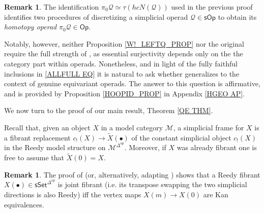 \documentclass[a4paper,10pt
,draft
]{article}%
\numberwithin{equation}{section}
\numberwithin{figure}{section}
\theoremstyle{definition} %
\newtheorem{remark}[equation]{Remark}%
\newcommand{\vect}[1]{\text{\overrightharp{\ensuremath{#1}}}}
\newcommand{\1}{\ensuremath{\mathbbm 1}}%
\begin{document}
\begin{remark}\label{TWOHOMOP REM}
	The identification
	$\pi_0 \mathcal{Q} \simeq 
	\tau \left(h c N (\mathcal{Q}) \right)$ 
	\cite[Prop. 4.8]{CM13b}
	used in the previous proof
	identifies two procedures of discretizing 
	a simplicial operad $\mathcal{Q} \in \mathsf{sOp}$
	to obtain its \emph{homotopy operad}
	$\pi_0 \mathcal{Q} \in \mathsf{Op}$.

	Notably, however, neither 
	Proposition \ref{W!_LEFTQ_PROP}
	nor the original 
	\cite[Prop. 4.9]{CM13b}
	require the full strength
	of \cite[Prop. 4.8]{CM13b}, 
	as essential surjectivity depends only on the 
	the category part within operads.
	Nonetheless, and in light of the fully faithful inclusions in 
	\eqref{ALLFULL EQ}
	it is natural to ask
	whether \cite[Prop. 4.8]{CM13b}
	generalizes to the context of genuine equivariant operads.
	The answer to this question is affirmative,
	and is provided by Proposition \ref{HOOPID_PROP}
	in Appendix \ref{HGEO AP}.
%	
%	
\end{remark}



We now turn to the proof of our main result,
Theorem \ref{QE THM}.


Recall that, given an object $X$ in a model category $\mathcal{M}$,
a simplicial frame for $X$ is a fibrant replacement
$c_!(X) \to \widetilde{X}(\bullet)$ of the constant 
simplicial object $c_!(X)$ in the Reedy model structure on $\mathcal{M}^{\Delta^{op}}$.
Moreover, if $X$ was already fibrant one is free to assume that $\widetilde{X}(0) = X$.

\begin{remark}\label{JOINTFIB REM}
	The proof of \cite[Prop. 4.5(ii)]{BP_edss}
	(or, alternatively, adapting \cite[Prop. 4.24(ii)]{BP_edss})
	shows that a Reedy fibrant $X(\bullet) \in \mathsf{sSet}^{\Delta^{op}}$
	is joint fibrant (i.e. its transpose swapping the two simplicial directions is also Reedy)
	iff the vertex maps $X(m) \to X(0)$
	are Kan equivalences.
\end{remark}
\end{document}
